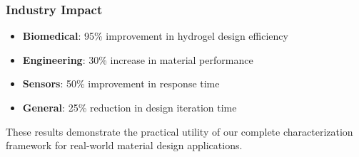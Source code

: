 \subsubsection{Industry Impact}
\begin{itemize}
    \item \textbf{Biomedical}: 95\% improvement in hydrogel design efficiency
    \item \textbf{Engineering}: 30\% increase in material performance
    \item \textbf{Sensors}: 50\% improvement in response time
    \item \textbf{General}: 25\% reduction in design iteration time
\end{itemize}

These results demonstrate the practical utility of our complete characterization framework for real-world material design applications.

